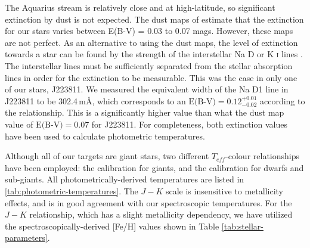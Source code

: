 \documentclass{emulateapj}
\begin{document}
The Aquarius stream is relatively close and at high-latitude, so significant extinction by dust is not expected. The dust maps of \citet{schlegel;et-al_1998} estimate that the extinction for our stars varies between E(B-V) = 0.03 to 0.07 mags. However, these maps are not perfect. As an alternative to using the \citet{schlegel;et-al_1998} dust maps, the level of extinction towards a star can be found by the strength of the interstellar Na D or K \textsc{i} lines \citep{munari;zwitter_1997}. The interstellar lines must be sufficiently separated from the stellar absorption lines in order for the extinction to be measurable. This was the case in only one of our stars, J223811. We measured the equivalent width of the Na D1 line in J223811 to be 302.4\,m{\AA}, which corresponds to an $\mbox{E(B-V)} = 0.12^{+0.01}_{-0.02}$ according to the \citet{munari;zwitter_1997} relationship. This is a significantly higher value than what the \citet{schlegel;et-al_1998} dust map value of $\mbox{E(B-V)} = 0.07$ for J223811. For completeness, both extinction values have been used to calculate photometric temperatures. 

Although all of our targets are giant stars, two different $T_{eff}$-colour relationships have been employed: the \citet{alonso;et-al_1999} calibration for giants, and the \citet{casagrande;et-al_2010} calibration for dwarfs and sub-giants. All photometrically-derived temperatures are listed in \ref{tab:photometric-temperatures}. The \citet{alonso;et-al_1999} $J-K$ scale is insensitive to metallicity effects, and is in good agreement with our spectroscopic temperatures. For the \citet{casagrande;et-al_2010} $J-K$ relationship, which has a slight metallicity dependency, we have utilized the spectroscopically-derived [Fe/H] values shown in Table \ref{tab:stellar-parameters}.
\end{document}
